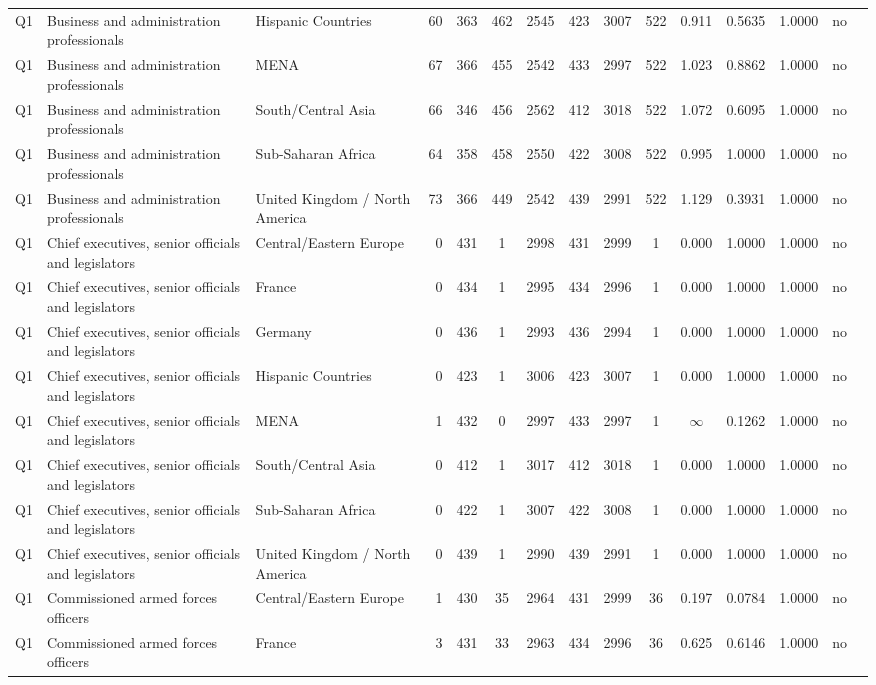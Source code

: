 \begin{longtable}{lllrcccccccccll}
Q1 & Business and administration professionals & Hispanic Countries & 60 & 363 & 462 & 2545 & 423 & 3007 & 522 & 0.911 & 0.5635 & 1.0000 & no \\
Q1 & Business and administration professionals & MENA & 67 & 366 & 455 & 2542 & 433 & 2997 & 522 & 1.023 & 0.8862 & 1.0000 & no \\
Q1 & Business and administration professionals & South/Central Asia & 66 & 346 & 456 & 2562 & 412 & 3018 & 522 & 1.072 & 0.6095 & 1.0000 & no \\
Q1 & Business and administration professionals & Sub-Saharan Africa & 64 & 358 & 458 & 2550 & 422 & 3008 & 522 & 0.995 & 1.0000 & 1.0000 & no \\
Q1 & Business and administration professionals & United Kingdom / North America & 73 & 366 & 449 & 2542 & 439 & 2991 & 522 & 1.129 & 0.3931 & 1.0000 & no \\
Q1 & Chief executives, senior officials and legislators & Central/Eastern Europe & 0 & 431 & 1 & 2998 & 431 & 2999 & 1 & 0.000 & 1.0000 & 1.0000 & no \\
Q1 & Chief executives, senior officials and legislators & France & 0 & 434 & 1 & 2995 & 434 & 2996 & 1 & 0.000 & 1.0000 & 1.0000 & no \\
Q1 & Chief executives, senior officials and legislators & Germany & 0 & 436 & 1 & 2993 & 436 & 2994 & 1 & 0.000 & 1.0000 & 1.0000 & no \\
Q1 & Chief executives, senior officials and legislators & Hispanic Countries & 0 & 423 & 1 & 3006 & 423 & 3007 & 1 & 0.000 & 1.0000 & 1.0000 & no \\
Q1 & Chief executives, senior officials and legislators & MENA & 1 & 432 & 0 & 2997 & 433 & 2997 & 1 & $\infty$ & 0.1262 & 1.0000 & no \\
Q1 & Chief executives, senior officials and legislators & South/Central Asia & 0 & 412 & 1 & 3017 & 412 & 3018 & 1 & 0.000 & 1.0000 & 1.0000 & no \\
Q1 & Chief executives, senior officials and legislators & Sub-Saharan Africa & 0 & 422 & 1 & 3007 & 422 & 3008 & 1 & 0.000 & 1.0000 & 1.0000 & no \\
Q1 & Chief executives, senior officials and legislators & United Kingdom / North America & 0 & 439 & 1 & 2990 & 439 & 2991 & 1 & 0.000 & 1.0000 & 1.0000 & no \\
Q1 & Commissioned armed forces officers & Central/Eastern Europe & 1 & 430 & 35 & 2964 & 431 & 2999 & 36 & 0.197 & 0.0784 & 1.0000 & no \\
Q1 & Commissioned armed forces officers & France & 3 & 431 & 33 & 2963 & 434 & 2996 & 36 & 0.625 & 0.6146 & 1.0000 & no \\

\end{longtable}
